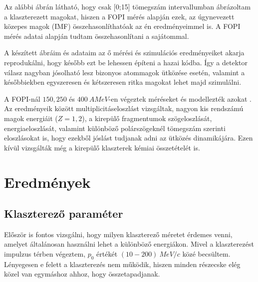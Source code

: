 \documentclass[a4paper,12pt]{article}
\begin{document}
\vspace{5mm}

\par Az alábbi ábrán látható, hogy csak [0;15] tömegszám intervallumban ábrázoltam a klaszterezett magokat, hiszen a FOPI mérés alapján ezek, az úgynevezett közepes magok (IMF) összehasonlíthatóak az én eredményeimmel is. A FOPI mérés adatai \cite{REISDORF1997493, SANTINI2005468} alapján tudtam összehasonlítani a sajátommal.

\vspace{5mm}

\par A készített ábráim és adataim az ő mérési és szimulációs eredményeiket akarja reprodukálni, hogy később ezt be lehessen építeni a hazai kódba. Így a detektor válasz nagyban jósolható lesz bizonyos atommagok ütközése esetén, valamint a későbbiekben egyszeresen és kétszeresen ritka magokat lehet majd szimulálni.

\vspace{5mm}

\par A FOPI-nál $150, 250$ és $400 ~A MeV$-en végeztek méréseket és modellezték azokat \cite{REISDORF1997493}. Az eredményeik között multiplicitáseloszlást vizsgáltak, nagyon kis rendszámú magok energiáit ($ Z = 1,2$), a kirepülő fragmentumok szögeloszlását, energiaeloszlását, valamint különböző polárszögeknél tömegszám szerinti eloszlásokat is, hogy ezekből jóslást tudjanak adni az ütközés dinamikájára. Ezen kívül vizsgálták még a kirepülő klaszterek kémiai összetételét is. 

\section{ Eredmények}

\vspace{5mm}

\subsection{ Klaszterező paraméter}

\vspace{5mm}

\par Először is fontos vizsgálni, hogy milyen klaszterező méretet érdemes venni, amelyet általánosan használni lehet a különböző energiákon. Mivel a klaszterezést impulzus térben végeztem, $p_{0}$ értékét $(10 - 200) ~MeV/c$ közé becsültem. Lényegesen e felett a klaszterezés nem működik, hiszen minden részecske elég közel van egymáshoz ahhoz, hogy összetapadjanak. 
\end{document}
